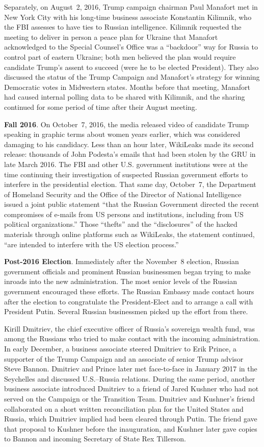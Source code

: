 Separately, on August~2, 2016, Trump campaign chairman Paul Manafort met in New York City with his long-time business associate Konstantin Kilimnik, who the FBI assesses to have ties to Russian intelligence.
Kilimnik requested the meeting to deliver in person a peace plan for Ukraine that Manafort acknowledged to the Special Counsel's Office was a ``backdoor'' way for Russia to control part of eastern Ukraine; both men believed the plan would require candidate Trump's assent to succeed (were he to be elected President).
They also discussed the status of the Trump Campaign and Manafort's strategy for winning Democratic votes in Midwestern states.
Months before that meeting, Manafort had caused internal polling data to be shared with Kilimnik, and the sharing continued for some period of time after their August meeting.

\textbf{Fall 2016}.
On October~7, 2016, the media released video of candidate Trump speaking in graphic terms about women years earlier, which was considered damaging to his candidacy.
Less than an hour later, WikiLeaks made its second release: thousands of John Podesta's emails that had been stolen by the GRU in late March 2016.
The FBI and other U.S. government institutions were at the time continuing their investigation of suspected Russian government efforts to interfere in the presidential election.
That same day, October~7, the Department of Homeland Security and the Office of the Director of National Intelligence issued a joint public statement ``that the Russian Government directed the recent compromises of e-mails from US persons and institutions, including from US political organizations.''
Those ``thefts'' and the ``disclosures'' of the hacked materials through online platforms such as WikiLeaks, the statement continued, ``are intended to interfere with the US election process.''

\textbf{Post-2016 Election}.
Immediately after the November~8 election, Russian government officials and prominent Russian businessmen began trying to make inroads into the new administration.
The most senior levels of the Russian government encouraged these efforts.
The Russian Embassy made contact hours after the election to congratulate the President-Elect and to arrange a call with President Putin.
Several Russian businessmen picked up the effort from there.

Kirill Dmitriev, the chief executive officer of Russia's sovereign wealth fund, was among the Russians who tried to make contact with the incoming administration.
In early December, a business associate steered Dmitriev to Erik Prince, a supporter of the Trump Campaign and an associate of senior Trump advisor Steve Bannon.
Dmitriev and Prince later met face-to-face in January 2017 in the Seychelles and discussed U.S.--Russia relations.
During the same period, another business associate introduced Dmitriev to a friend of Jared Kushner who had not served on the Campaign or the Transition Team.
Dmitriev and Kushner's friend collaborated on a short written reconciliation plan for the United States and Russia, which Dmitriev implied had been cleared through Putin.
The friend gave that proposal to Kushner before the inauguration, and Kushner later gave copies to Bannon and incoming Secretary of State Rex Tillerson.

